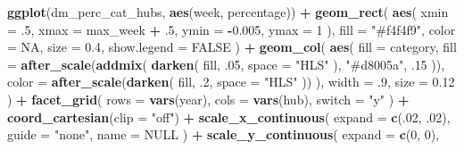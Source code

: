 \documentclass[
]{book}
\newenvironment{Shaded}{\begin{snugshade}}{\end{snugshade}}
\newcommand{\AttributeTok}[1]{\textcolor[rgb]{0.13,0.29,0.53}{#1}}
\newcommand{\ConstantTok}[1]{\textcolor[rgb]{0.56,0.35,0.01}{#1}}
\newcommand{\DecValTok}[1]{\textcolor[rgb]{0.00,0.00,0.81}{#1}}
\newcommand{\FloatTok}[1]{\textcolor[rgb]{0.00,0.00,0.81}{#1}}
\newcommand{\FunctionTok}[1]{\textcolor[rgb]{0.13,0.29,0.53}{\textbf{#1}}}
\newcommand{\NormalTok}[1]{#1}
\newcommand{\SpecialCharTok}[1]{\textcolor[rgb]{0.81,0.36,0.00}{\textbf{#1}}}
\newcommand{\StringTok}[1]{\textcolor[rgb]{0.31,0.60,0.02}{#1}}
\begin{document}
\begin{Shaded}
\begin{Highlighting}[]
\FunctionTok{ggplot}\NormalTok{(dm\_perc\_cat\_hubs, }\FunctionTok{aes}\NormalTok{(week, percentage)) }\SpecialCharTok{+}
  \FunctionTok{geom\_rect}\NormalTok{(}
    \FunctionTok{aes}\NormalTok{(}
      \AttributeTok{xmin =}\NormalTok{ .}\DecValTok{5}\NormalTok{,}
      \AttributeTok{xmax =}\NormalTok{ max\_week }\SpecialCharTok{+}\NormalTok{ .}\DecValTok{5}\NormalTok{,}
      \AttributeTok{ymin =} \SpecialCharTok{{-}}\FloatTok{0.005}\NormalTok{,}
      \AttributeTok{ymax =} \DecValTok{1}
\NormalTok{    ),}
    \AttributeTok{fill =} \StringTok{"\#f4f4f9"}\NormalTok{,}
    \AttributeTok{color =} \ConstantTok{NA}\NormalTok{,}
    \AttributeTok{size =} \FloatTok{0.4}\NormalTok{,}
    \AttributeTok{show.legend =} \ConstantTok{FALSE}
\NormalTok{  ) }\SpecialCharTok{+}
  \FunctionTok{geom\_col}\NormalTok{(}
    \FunctionTok{aes}\NormalTok{(}
      \AttributeTok{fill =}\NormalTok{ category,}
      \AttributeTok{fill =} \FunctionTok{after\_scale}\NormalTok{(}\FunctionTok{addmix}\NormalTok{(}
        \FunctionTok{darken}\NormalTok{(}
\NormalTok{          fill,}
\NormalTok{          .}\DecValTok{05}\NormalTok{,}
          \AttributeTok{space =} \StringTok{"HLS"}
\NormalTok{        ),}
        \StringTok{"\#d8005a"}\NormalTok{,}
\NormalTok{        .}\DecValTok{15}
\NormalTok{      )),}
      \AttributeTok{color =} \FunctionTok{after\_scale}\NormalTok{(}\FunctionTok{darken}\NormalTok{(}
\NormalTok{        fill,}
\NormalTok{        .}\DecValTok{2}\NormalTok{,}
        \AttributeTok{space =} \StringTok{"HLS"}
\NormalTok{      ))}
\NormalTok{    ),}
    \AttributeTok{width =}\NormalTok{ .}\DecValTok{9}\NormalTok{,}
    \AttributeTok{size =} \FloatTok{0.12}
\NormalTok{  ) }\SpecialCharTok{+}
  \FunctionTok{facet\_grid}\NormalTok{(}
    \AttributeTok{rows =} \FunctionTok{vars}\NormalTok{(year),}
    \AttributeTok{cols =} \FunctionTok{vars}\NormalTok{(hub),}
    \AttributeTok{switch =} \StringTok{"y"}
\NormalTok{  ) }\SpecialCharTok{+}
  \FunctionTok{coord\_cartesian}\NormalTok{(}\AttributeTok{clip =} \StringTok{"off"}\NormalTok{) }\SpecialCharTok{+}
  \FunctionTok{scale\_x\_continuous}\NormalTok{(}
    \AttributeTok{expand =} \FunctionTok{c}\NormalTok{(.}\DecValTok{02}\NormalTok{, .}\DecValTok{02}\NormalTok{),}
    \AttributeTok{guide =} \StringTok{"none"}\NormalTok{,}
    \AttributeTok{name =} \ConstantTok{NULL}
\NormalTok{  ) }\SpecialCharTok{+}
  \FunctionTok{scale\_y\_continuous}\NormalTok{(}
    \AttributeTok{expand =} \FunctionTok{c}\NormalTok{(}\DecValTok{0}\NormalTok{, }\DecValTok{0}\NormalTok{),}

\end{Highlighting}
\end{Shaded}
\end{document}
